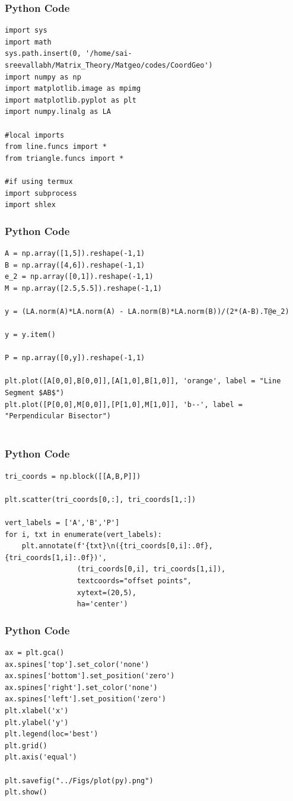 \documentclass{beamer}
\begin{document}


\begin{frame}[fragile]
    \frametitle{Python Code}
    \begin{lstlisting}
import sys
import math
sys.path.insert(0, '/home/sai-sreevallabh/Matrix_Theory/Matgeo/codes/CoordGeo')
import numpy as np
import matplotlib.image as mpimg
import matplotlib.pyplot as plt
import numpy.linalg as LA

#local imports
from line.funcs import *
from triangle.funcs import *

#if using termux
import subprocess
import shlex

\end{lstlisting}
\end{frame}

\begin{frame}[fragile]
    \frametitle{Python Code}
    \begin{lstlisting}
A = np.array([1,5]).reshape(-1,1)
B = np.array([4,6]).reshape(-1,1)
e_2 = np.array([0,1]).reshape(-1,1)
M = np.array([2.5,5.5]).reshape(-1,1)

y = (LA.norm(A)*LA.norm(A) - LA.norm(B)*LA.norm(B))/(2*(A-B).T@e_2)

y = y.item()

P = np.array([0,y]).reshape(-1,1)

plt.plot([A[0,0],B[0,0]],[A[1,0],B[1,0]], 'orange', label = "Line Segment $AB$")
plt.plot([P[0,0],M[0,0]],[P[1,0],M[1,0]], 'b--', label = "Perpendicular Bisector")


\end{lstlisting}
\end{frame}

\begin{frame}[fragile]
    \frametitle{Python Code}
    \begin{lstlisting}
tri_coords = np.block([[A,B,P]])

plt.scatter(tri_coords[0,:], tri_coords[1,:])

vert_labels = ['A','B','P']
for i, txt in enumerate(vert_labels):
    plt.annotate(f'{txt}\n({tri_coords[0,i]:.0f}, {tri_coords[1,i]:.0f})',
                 (tri_coords[0,i], tri_coords[1,i]), 
                 textcoords="offset points", 
                 xytext=(20,5), 
                 ha='center') 
\end{lstlisting}
\end{frame}

\begin{frame}[fragile]
    \frametitle{Python Code}
    \begin{lstlisting}
ax = plt.gca()
ax.spines['top'].set_color('none')
ax.spines['bottom'].set_position('zero')
ax.spines['right'].set_color('none')
ax.spines['left'].set_position('zero')
plt.xlabel('x')
plt.ylabel('y')
plt.legend(loc='best')
plt.grid()
plt.axis('equal')

plt.savefig("../Figs/plot(py).png")
plt.show()


    \end{lstlisting}
\end{frame}
\end{document}
